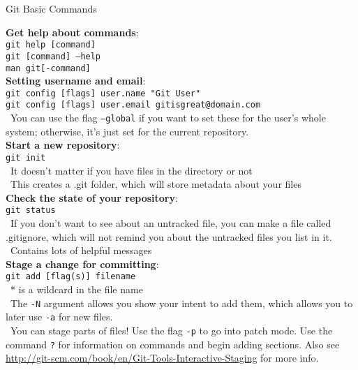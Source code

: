 \documentclass[12pt]{article}
\begin{document}
\begin{center}
{\large Git Basic Commands}
\end{center}
{\setlength{\parindent}{0cm}    
{\bf Get help about commands}:\\
\texttt{git help [command]}\\
\texttt{git [command] --help}\\
\texttt{man git[-command]}\\

{\bf Setting username and email}:\\
\texttt{git config [flags] user.name "Git User"}\\
\texttt{git config [flags] user.email gitisgreat@domain.com}\\
\textbullet\, You can use the flag \texttt{--global} if you want to set these for the user's whole system; otherwise, it's just set for the current repository.\\

{\bf Start a new repository}:\\
\texttt{git init}\\
\textbullet\, It doesn't matter if you have files in the directory or not\\
\textbullet\, This creates a .git folder, which will store metadata about your files\\

{\bf Check the state of your repository}:\\
\texttt{git status}\\
\textbullet\, If you don't want to see about an untracked file, you can make a file called .gitignore, which will not remind you about the untracked files you list in it.\\
\textbullet\, Contains lots of helpful messages\\

{\bf Stage a change for committing}:\\
\texttt{git add [flag(s)] filename}\\
\textbullet\, * is a wildcard in the file name\\
\textbullet\, The \texttt{-N} argument allows you show your intent to add them, which allows you to later use \texttt{-a} for new files.\\
\textbullet\, You can stage parts of files! Use the flag \texttt{-p} to go into patch mode. Use the command \texttt{?} for information on commands and begin adding sections. Also see\\ \url{http://git-scm.com/book/en/Git-Tools-Interactive-Staging} for more info.\\

}
\end{document}
